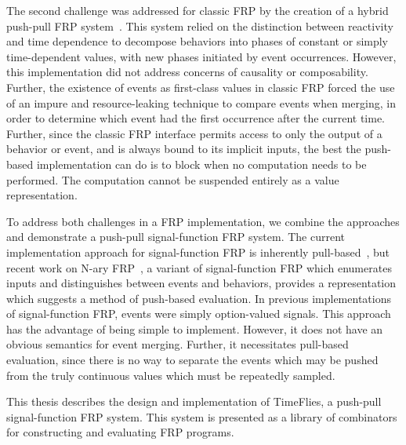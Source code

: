The second challenge was addressed for classic FRP by the creation of a hybrid
push-pull FRP system~\cite{Elliott2009}. This system relied on the distinction
between reactivity and time dependence to decompose behaviors into phases of
constant or simply time-dependent values, with new phases initiated by event
occurrences. However, this implementation did not address concerns of causality
or composability. Further, the existence of events as first-class values in
classic FRP forced the use of an impure and resource-leaking technique to
compare events when merging, in order to determine which event had the first
occurrence after the current time. Further, since the classic FRP interface
permits access to only the output of a behavior or event, and is always bound to
its implicit inputs, the best the push-based implementation can do is to block
when no computation needs to be performed. The computation cannot be suspended
entirely as a value representation.

To address both challenges in a FRP implementation, we combine the approaches
and demonstrate a push-pull signal-function FRP system. The current
implementation approach for signal-function FRP is inherently
pull-based~\cite{Nilsson2002}, but recent work on N-ary
FRP~\cite{Sculthorpe2011}, a variant of signal-function FRP which enumerates
inputs and distinguishes between events and behaviors, provides a representation
which suggests a method of push-based evaluation. In previous implementations of
signal-function FRP, events were simply option-valued signals. This approach has
the advantage of being simple to implement. However, it does not have an obvious
semantics for event merging. Further, it necessitates pull-based evaluation,
since there is no way to separate the events which may be pushed from the truly
continuous values which must be repeatedly sampled.

This thesis describes the design and implementation of TimeFlies, a push-pull signal-function FRP system. This system is presented as a library
of combinators for constructing and evaluating FRP programs.
